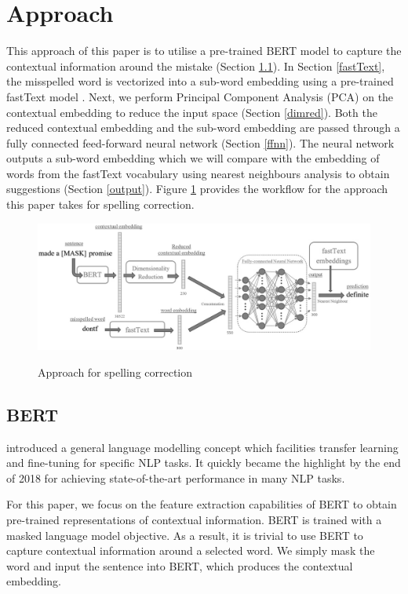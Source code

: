 \documentclass[11pt,a4paper]{article}
\begin{document}
\section{Approach}\label{approach}
This approach of this paper is to utilise a pre-trained BERT \cite{bert} model to capture the contextual information around the mistake (Section \ref{bert}). In Section \ref{fastText}, the misspelled word is vectorized into a sub-word embedding using a pre-trained fastText model \cite{fastText}. Next, we perform Principal Component Analysis (PCA) on the contextual embedding to reduce the input space (Section \ref{dimred}).  Both the reduced contextual embedding and the sub-word embedding are passed through a fully connected feed-forward neural network (Section \ref{ffnn}). The neural network outputs a sub-word embedding which we will compare with the embedding of words from the fastText vocabulary using nearest neighbours analysis to obtain suggestions (Section \ref{output}). Figure \ref{img:approach} provides the workflow for the approach this paper takes for spelling correction.

\begin{figure}
\caption{Approach for spelling correction}
\centering
\includegraphics[width=16.4cm]{Flowchart_BW.jpg}
\label{img:approach}
\end{figure}

\subsection{BERT}
\label{bert}
\citet{bert} introduced a general language modelling concept which facilities transfer learning and fine-tuning for specific NLP tasks. It quickly became the highlight by the end of 2018 for achieving state-of-the-art performance in many NLP tasks. 

For this paper, we focus on the feature extraction capabilities of BERT to obtain pre-trained representations of contextual information. BERT is trained with a masked language model objective. As a result, it is trivial to use BERT to capture contextual information around a selected word. We simply mask the word and input the sentence into BERT, which produces the contextual embedding.
\end{document}
